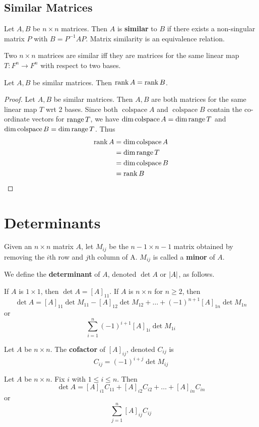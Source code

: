 \documentclass{article}
\DeclareMathOperator{\colspace}{colspace}
\begin{document}
\subsection{Similar Matrices}
\begin{definition}
  Let $A, B$ be $n \times n$ matrices. Then $A$ is \textbf{similar} to $B$ if there exists a non-singular matrix $P$ with $B = P^{-1}AP$.
  Matrix similarity is an equivalence relation.
\end{definition}
\begin{theorem}
  Two $n \times n$ matrices are similar iff they are matrices for the same linear map $T: F^n \to F^n$ with respect to two bases.
\end{theorem}
\begin{theorem}
  Let $A, B$ be similar matrices. Then $\rank A = \rank B$.
\end{theorem}
\begin{proof}
  Let $A, B$ be similar matrices. Then $A, B$ are both matrices for the same linear map $T$ wrt 2 bases. Since both $\colspace A$ and $\colspace B$ contain the co-ordinate vectors for $\operatorname{\text{range}} T$, we have $\dim \colspace A = \dim \range T$ and $\dim \colspace B = \dim \range T$. Thus
  \begin{align*}
    \rank A &= \dim \colspace A\\
    &= \dim \range T\\
    &= \dim \colspace B\\
    &= \rank B
  \end{align*}
\end{proof}
\section{Determinants}
\begin{definition}
  Given an $n \times n$ matrix $A$, let $M_{ij}$ be the $n - 1 \times n - 1$ matrix obtained by removing the $i$th row and $j$th column of A. $M_{ij}$ is called a \textbf{minor} of $A$.

  We define the \textbf{determinant} of $A$, denoted $\det A$ or $\abs{A}$, as follows.

  If $A$ is $1 \times 1$, then $\det A = [A]_{11}$.
  If $A$ is $n \times n$ for $n \geq 2$, then \[
    \det A = [A]_{11} \det M_{11} - [A]_{12} \det M_{12} + \dots + (-1)^{n+1}[A]_{1n}\det M_{1n}
  \] or \[
    \sum_{i=1}^n (-1)^{i+1}[A]_{1i}\det M_{1i}
  \]
\end{definition}
\begin{definition}
  Let $A$ be $n \times n$. The \textbf{cofactor} of $[A]_{ij}$, denoted $C_{ij}$ is \[
    C_{ij} = (-1)^{i+j} \det M_{ij}
  \]
\end{definition}
\begin{theorem}
  Let $A$ be $n \times n$. Fix $i$ with $1 \leq i \leq n$. Then \[
    \det A = [A]_{i1}C_{11} + [A]_{i2}C_{i2} + \dots + [A]_{in}C_{in}
  \] or \[
    \sum_{j=1}^n [A]_{ij}C_{ij}
  \]
\end{theorem}
\end{document}
